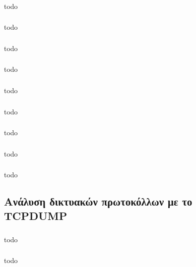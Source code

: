 \documentclass[a4paper, 12pt]{article}
\begin{document}
		\subsubsection{}
			todo

		\subsubsection{}
			todo

		\subsubsection{}
			todo

		\subsubsection{}
			todo

		\subsubsection{}
			todo

		\subsubsection{}
			todo

		\subsubsection{}
			todo

		\subsubsection{}
			todo

		\subsubsection{}
			todo

	\subsection{Ανάλυση δικτυακών πρωτοκόλλων με το TCPDUMP}

		\subsubsection{}
			todo

		\subsubsection{}
			todo
\end{document}

